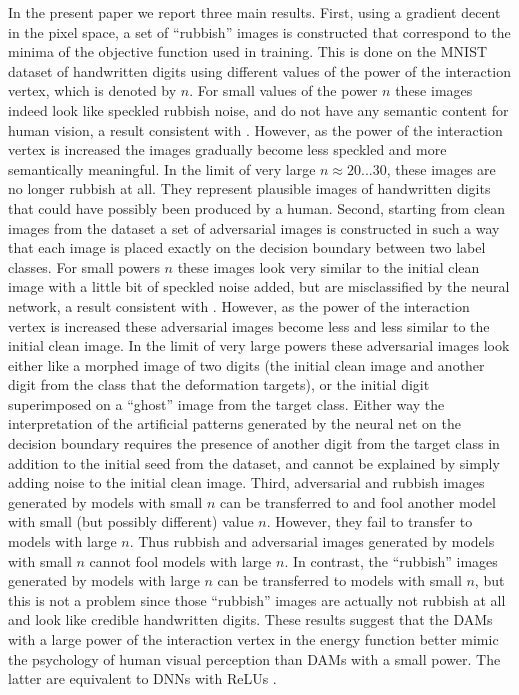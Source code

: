 \documentclass[12pt]{article} %
\begin{document}
In the present paper we report three main results. First, using a gradient decent in the pixel space, a set of ``rubbish'' images is constructed that correspond to the minima of the objective function used in training. This is done on the MNIST dataset of handwritten digits using different values of the power of the interaction vertex, which is denoted by $n$. For small values of the power $n$ these images indeed look like speckled rubbish noise, and do not have any semantic content for human vision, a result consistent with \cite{Nguyen}. However, as the power of the interaction vertex is increased the images gradually become less speckled and more semantically meaningful. In the limit of very large $n\approx20...30$, these images are no longer rubbish at all. They represent plausible images of handwritten digits that could have possibly been produced by a human. Second, starting from clean images from the dataset a set of adversarial images is constructed in such a way that each image is placed exactly on the decision boundary between two label classes. For small powers $n$ these images look very similar to the initial clean image with a little bit of speckled noise added, but are misclassified by the neural network, a result consistent with \cite{Szegedy}. However, as the power of the interaction vertex is increased these adversarial images become less and less similar to the initial clean image. In the limit of very large powers these adversarial images look either like a morphed image of two digits (the initial clean image and another digit from the class that the deformation targets), or the initial digit superimposed on a ``ghost'' image from the target class. Either way the interpretation of the artificial patterns generated by the neural net on the decision boundary requires the presence of another digit from the target class in addition to the initial seed from the dataset, and cannot be explained by simply adding noise to the initial clean image. Third, adversarial and rubbish images generated by models with small $n$ can be transferred to and fool another model with small (but possibly different) value $n$. However, they fail to transfer to models with large $n$. Thus rubbish and adversarial images generated by models with small $n$ cannot fool models with large $n$. In contrast, the ``rubbish'' images generated by models with large $n$ can be transferred to models with small $n$, but this is not a problem since those ``rubbish'' images are actually not rubbish at all and look like credible handwritten digits. These results suggest that the DAMs with a large power of the interaction vertex in the energy function better mimic the psychology of human visual perception than DAMs with a small power. The latter are equivalent to DNNs with ReLUs \cite{Krotov Hopfield}.
\end{document}
